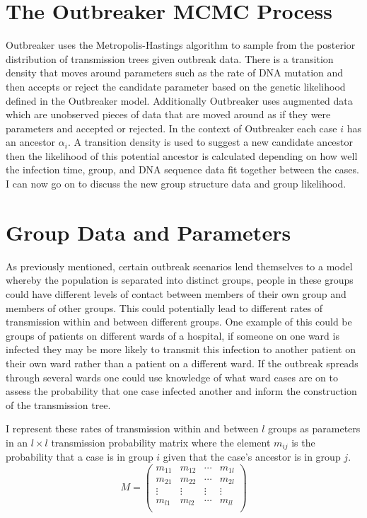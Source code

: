 \documentclass[11pt,a4paper]{report}
\begin{document}
\section{The Outbreaker MCMC Process}
Outbreaker uses the Metropolis-Hastings algorithm to sample from the posterior distribution of transmission trees given outbreak data. There is a transition density that moves around parameters such as the rate of DNA mutation and then accepts or reject the candidate parameter based on the genetic likelihood defined in the Outbreaker model. Additionally Outbreaker uses augmented data which are unobserved pieces of data that are moved around as if they were parameters and accepted or rejected. In the context of Outbreaker each case $i$ has an ancestor $\alpha_i$. A transition density is used to suggest a new candidate ancestor then the likelihood of this potential ancestor is calculated depending on how well the infection time, group, and DNA sequence data fit together between the cases. I can now go on to discuss the new group structure data and group likelihood.



\section{Group Data and Parameters}
As previously mentioned, certain outbreak scenarios lend themselves to a model whereby the population is separated into distinct groups, people in these groups could have different levels of contact between members of their own group and members of other groups. This could potentially lead to different rates of transmission within and between different groups. One example of this could be groups of patients on different wards of a hospital, if someone on one ward is infected they may be more likely to transmit this infection to another patient on their own ward rather than a patient on a different ward. If the outbreak spreads through several wards one could use knowledge of what ward cases are on to assess the probability that one case infected another and inform the construction of the transmission tree.

I represent these rates of transmission within and between $l$ groups as parameters in an $l \times l$ transmission probability matrix where the element $m_{ij}$ is the probability that a case is in group $i$ given that the case's ancestor is in group $j$.
\[ M = \left( \begin{array}{cccc}
m_{11} & m_{12} & \cdots & m_{1l} \\
m_{21} & m_{22} & \cdots & m_{2l} \\
\vdots & \vdots & \vdots & \vdots \\
m_{l1} & m_{l2} & \cdots & m_{ll} \\
\end{array} \right) \] 
\end{document}
